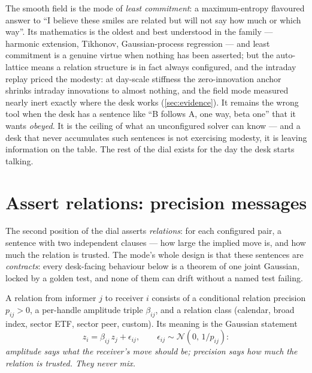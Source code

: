 \documentclass[11pt]{article}
\begin{document}
\begin{heuristic}
The smooth field is the mode of \emph{least commitment}: a maximum-entropy
flavoured answer to ``I believe these smiles are related but will not say
how much or which way''.  Its mathematics is the oldest and best understood
in the family --- harmonic extension, Tikhonov, Gaussian-process
regression --- and least commitment is a genuine virtue when nothing has
been asserted; but the auto-lattice means a relation structure is in fact
always configured, and the intraday replay priced the modesty: at
day-scale stiffness the zero-innovation anchor shrinks intraday
innovations to almost nothing, and the field mode measured nearly inert
exactly where the desk works (\cref{sec:evidence}).  It remains the wrong
tool when the desk
has a sentence like ``B follows A, one way, beta one'' that it wants
\emph{obeyed}.  It is the ceiling of what an unconfigured solver can know
--- and a desk that never accumulates such sentences is not exercising
modesty, it is leaving information on the table.  The rest of the dial
exists for the day the desk starts talking.
\end{heuristic}

\section{Assert relations: precision messages}
\label{sec:messages}

The second position of the dial asserts \emph{relations}: for each
configured pair, a sentence with two independent clauses --- how large the
implied move is, and how much the relation is trusted.  The mode's whole
design is that these sentences are \emph{contracts}: every desk-facing
behaviour below is a theorem of one joint Gaussian, locked by a golden
test, and none of them can drift without a named test failing.

\begin{definition}
\label{def:edge}
A relation from informer $j$ to receiver $i$ consists of a conditional
relation precision $p_{ij}>0$, a per-handle amplitude triple $\beta_{ij}$,
and a relation class (calendar, broad index, sector ETF, sector peer,
custom).  Its meaning is the Gaussian statement
\[
z_i=\beta_{ij}\,z_j+\epsilon_{ij},
\qquad \epsilon_{ij}\sim\mathcal N(0,\,1/p_{ij}):
\]
\emph{amplitude says what the receiver's move should be; precision says how
much the relation is trusted.  They never mix.}
\end{definition}
\end{document}
